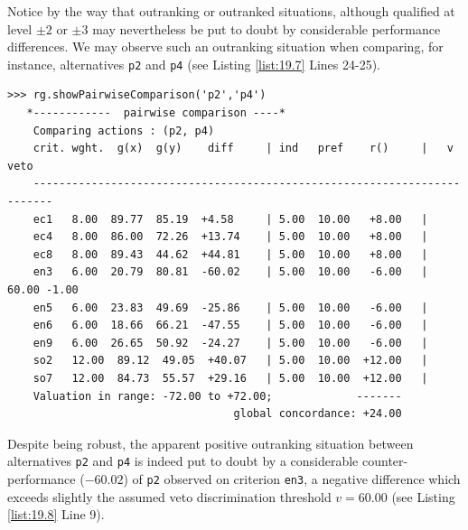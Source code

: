 Notice by the way that outranking or outranked situations, although qualified at level $\pm 2$ or $\pm 3$ may nevertheless be put to doubt by considerable performance differences. We may observe such an outranking situation when comparing, for instance, alternatives \texttt{p2} and \texttt{p4} (see Listing \ref{list:19.7} Lines 24-25).
\begin{lstlisting}[caption={Comparing alternatives 'p2' and 'p4'},label=list:19.8,basicstyle=\ttfamily\scriptsize]
>>> rg.showPairwiseComparison('p2','p4')
   *------------  pairwise comparison ----*
    Comparing actions : (p2, p4)
    crit. wght.  g(x)  g(y)    diff  	| ind   pref    r() 	|   v    veto
    -------------------------------------------------------------------------
    ec1   8.00  89.77  85.19  +4.58 	| 5.00  10.00   +8.00 	| 
    ec4   8.00  86.00  72.26  +13.74 	| 5.00  10.00   +8.00 	| 
    ec8   8.00  89.43  44.62  +44.81 	| 5.00  10.00   +8.00 	| 
    en3   6.00  20.79  80.81  -60.02 	| 5.00  10.00   -6.00 	| 60.00 -1.00
    en5   6.00  23.83  49.69  -25.86 	| 5.00  10.00   -6.00 	| 
    en6   6.00  18.66  66.21  -47.55 	| 5.00  10.00   -6.00 	| 
    en9   6.00  26.65  50.92  -24.27 	| 5.00  10.00   -6.00 	| 
    so2   12.00  89.12  49.05  +40.07 	| 5.00  10.00  +12.00 	| 
    so7   12.00  84.73  55.57  +29.16 	| 5.00  10.00  +12.00   |
    Valuation in range: -72.00 to +72.00;             -------
                                   global concordance: +24.00      
\end{lstlisting}
Despite being robust, the apparent positive outranking situation between alternatives \texttt{p2} and \texttt{p4} is indeed put to doubt by a considerable counter-performance ($-60.02$) of \texttt{p2} observed on criterion \texttt{en3}, a negative difference which exceeds slightly the assumed veto discrimination threshold $v = 60.00$ (see Listing \ref{list:19.8} Line 9).

